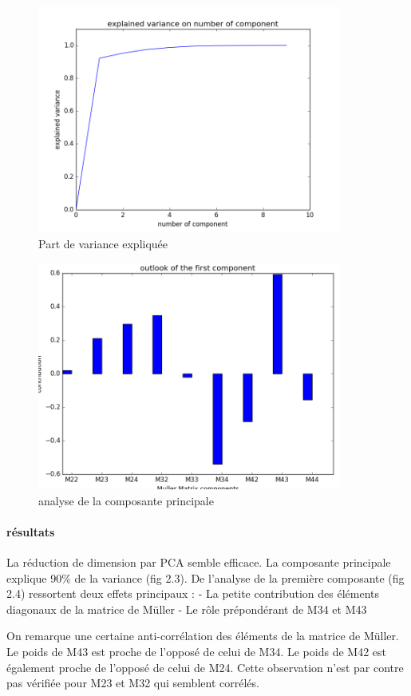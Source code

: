 \documentclass[a4paper,10pt]{report}
\begin{document}
\begin{figure}
  \caption{Part de variance expliquée}
  \centering
  \includegraphics[width=10cm]{PCA_3.png}
\end{figure}
\begin{figure}
  \caption{analyse de la composante principale}
  \centering
  \includegraphics[width=10cm]{PCA_2.png}
\end{figure}

\paragraph{résultats}
La réduction de dimension par PCA semble efficace. La composante principale explique 90\% de la variance (fig 2.3). 
De l'analyse de la première composante (fig 2.4) ressortent deux effets principaux :
- La petite contribution des éléments diagonaux de la matrice de Müller
- Le rôle prépondérant de M34 et M43

On remarque une certaine anti-corrélation des éléments de la matrice de Müller. Le poids de M43 est proche de l'opposé de celui de M34. Le poids de M42 est également proche de l'opposé de celui de M24. Cette observation n'est par contre pas vérifiée pour M23 et M32 qui semblent corrélés.
\end{document}
